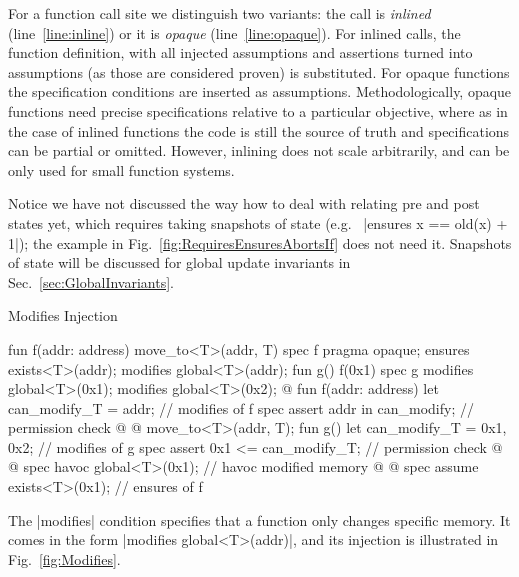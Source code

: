 For a function call site we distinguish two variants: the call is \emph{inlined}
(line~\ref{line:inline}) or it is \emph{opaque} (line~\ref{line:opaque}).  For
inlined calls, the function definition, with all injected assumptions and
assertions turned into assumptions (as those are considered proven) is
substituted. For opaque functions the specification conditions are inserted as
assumptions. Methodologically, opaque functions need precise specifications
relative to a particular objective, where as in the case of inlined functions
the code is still the source of truth and specifications can be partial or
omitted. However, inlining does not scale arbitrarily, and can be only used for
small function systems.

Notice we have not discussed the way how to deal with relating pre and post
states yet, which requires taking snapshots of state (e.g.~%
|ensures x == old(x) + 1|); the example in
Fig.~\ref{fig:RequiresEnsuresAbortsIf} does not need it. Snapshots of state
will be discussed for global update invariants in Sec.~\ref{sec:GlobalInvariants}.


\begin{Figure}
  \caption{Modifies Injection}
  \label{fig:Modifies}
  \centering
\begin{MoveBoxNumbered}
  fun f(addr: address) { move_to<T>(addr, T{}) }
  spec f {
    pragma opaque;
    ensures exists<T>(addr);
    modifies global<T>(addr);
  }
  fun g() { f(0x1) }
  spec g {
    modifies global<T>(0x1); modifies global<T>(0x2);
  }
  @\transform@
  fun f(addr: address) {
    let can_modify_T = {addr};      // modifies of f
    spec assert addr in can_modify; // permission check @%
                                            \label{line:modifies_permission}@
    move_to<T>(addr, T{});
  }
  fun g() {
    let can_modify_T = {0x1, 0x2};  // modifies of g
    spec assert {0x1} <= can_modify_T; // permission check @%
                                            \label{line:modifies_call_permission}@
    spec havoc global<T>(0x1);      // havoc modified memory @%
                                            \label{line:modifies_havoc}@
    spec assume exists<T>(0x1);     // ensures of f
  }
\end{MoveBoxNumbered}
\end{Figure}


The |modifies| condition specifies that a function only changes specific memory.
It comes in the form |modifies global<T>(addr)|, and its injection is
illustrated in Fig.~\ref{fig:Modifies}.

